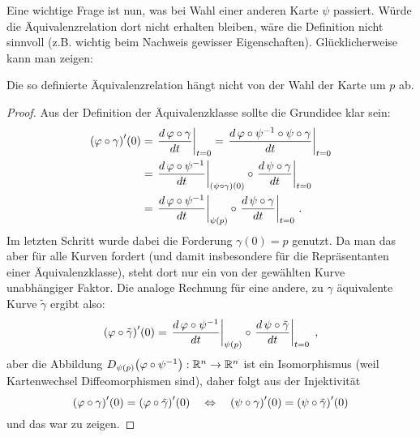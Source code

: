 \documentclass[../H_Analysis_main.tex]{subfiles}
\begin{document}
Eine wichtige Frage ist nun, was bei Wahl einer anderen Karte $\psi$ passiert. Würde die Äquivalenzrelation dort nicht erhalten bleiben, wäre die Definition nicht sinnvoll (z.B. wichtig beim Nachweis gewisser Eigenschaften). Glücklicherweise kann man zeigen:

\begin{satz}[Kartenunabhängigkeit]
Die so definierte Äquivalenzrelation hängt nicht von der Wahl der Karte um $p$ ab.
\end{satz}
\begin{proof}
Aus der Definition der Äquivalenzklasse sollte die Grundidee klar sein:
\begin{align*}
\qty(\varphi \circ \gamma)'(0) &= \eval{\dv{\, \varphi \circ \gamma}{t}}_{t = 0} = \eval{\dv{\, \varphi  \circ \psi^{-1} \circ \psi \circ \gamma}{t}}_{t = 0} %
\\
&= \eval{\dv{\, \varphi  \circ \psi^{-1}}{t}}_{\qty(\psi \circ \gamma)(0)} \circ \eval{\dv{\, \psi \circ \gamma}{t}}_{t = 0} %
\\
&= \eval{\dv{\, \varphi \circ \psi^{-1}}{t}}_{\psi(p)} \circ \eval{\dv{\, \psi \circ \gamma}{t}}_{t = 0} \, . %
\end{align*}
Im letzten Schritt wurde dabei die Forderung $\gamma(0) = p$ genutzt. Da man das aber für alle Kurven fordert (und damit insbesondere für die Repräsentanten einer Äquivalenzklasse), steht dort nur ein von der gewählten Kurve unabhängiger Faktor. Die analoge Rechnung für eine andere, zu $\gamma$ äquivalente Kurve $\tilde{\gamma}$ ergibt also:
\begin{equation*}
\qty(\varphi \circ \tilde{\gamma})'(0) = \eval{\dv{\, \varphi  \circ \psi^{-1}}{t}}_{\psi(p)} \circ \eval{\dv{\, \psi \circ \tilde{\gamma}}{t}}_{t = 0} \; ,  %
\end{equation*}
aber die Abbildung $D_{\psi(p)} \qty(\varphi  \circ \psi^{-1}): \mathbb{R}^n \rightarrow \mathbb{R}^n$
ist ein Isomorphismus (weil Kartenwechsel Diffeomorphismen sind), daher folgt aus der Injektivität
\begin{equation*}
\qty(\varphi \circ \gamma)'(0) = \qty(\varphi \circ \tilde{\gamma})'(0) \quad \Leftrightarrow \quad \qty(\psi \circ \gamma)'(0) = \qty(\psi \circ \tilde{\gamma})'(0)
\end{equation*}
und das war zu zeigen.
\end{proof}
\end{document}
